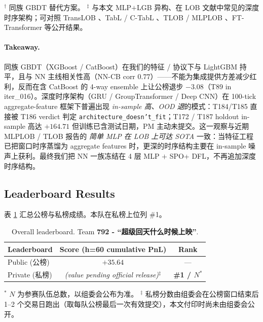 \documentclass[11pt]{article}
\begin{document}
\begin{table}[!htbp]
\vspace{2pt}\footnotesize
\raggedright
$^{\dagger}$ 同族 GBDT 替代方案。\quad
$^{\ddagger}$ 与本文 MLP$+$LGB 异构、在 LOB 文献中常见的深度时序架构；可对照 TransLOB \cite{translob}、TabL / C-TabL \cite{tabl_ctabl}、TLOB / MLPLOB \cite{tlob_mlplob}、FT-Transformer \cite{ft_transformer} 等公开结果。
\end{table}

\paragraph{Takeaway.}
同族 GBDT（XGBoost / CatBoost）在我们的特征 / 协议下与 LightGBM 持平，且与 NN 主线相关性高（NN-CB corr $0.77$）——不能为集成提供方差减少红利，反而在含 CatBoost 的 4-way ensemble 上让公榜退步 $-3.08$（T89 in iter\_016）。深度时序架构（GRU / GroupTransformer / Deep CNN）在 100-tick aggregate-feature 框架下普遍出现 \emph{in-sample 高、OOD 退}的模式：T184/T185 直接被 T186 verdict 判定 \texttt{architecture\_doesn't\_fit}；T172 / T187 holdout in-sample 高达 $+164.71$ 但训练已含测试日期，PM 主动未提交。这一观察与近期 MLPLOB / TLOB \cite{tlob_mlplob} 报告的 \emph{简单 MLP 在 LOB 上可达 SOTA} 一致：当特征工程已把窗口时序蒸馏为 aggregate features 时，更深的时序结构主要在 in-sample 噪声上获利。最终我们把 NN 一族冻结在 4 层 MLP $+$ SPO+ DFL，不再追加深度时序结构。

\subsection{Leaderboard Results}
\label{sec:lb}

表 \ref{tab:lb} 汇总公榜与私榜成绩。本队在私榜上位列 \#1。

\begin{table}[t]
\centering
\caption{Overall leaderboard. Team \textbf{792 - ``超级回天什么时候上映''}.}
\label{tab:lb}
\setlength{\tabcolsep}{8pt}\renewcommand{\arraystretch}{1.20}
\begin{tabular}{@{}l c c@{}}
\toprule
Leaderboard & Score (h=60 cumulative PnL) & Rank \\
\midrule
Public (公榜)  & $+35.64$ & ---      \\
Private (私榜) & \textit{(value pending official release)}$^{\ddagger}$ & \textbf{\#1 / $N^{*}$} \\
\bottomrule
\end{tabular}

\vspace{2pt}\footnotesize
\raggedright
$^{*}$ $N$ 为参赛队伍总数，以组委会公布为准。\quad
$^{\ddagger}$ 私榜分数由组委会在公榜窗口结束后 1--2 个交易日跑出（取每队公榜最后一次有效提交），本文付印时尚未由组委会公开。
\end{table}
\end{document}
